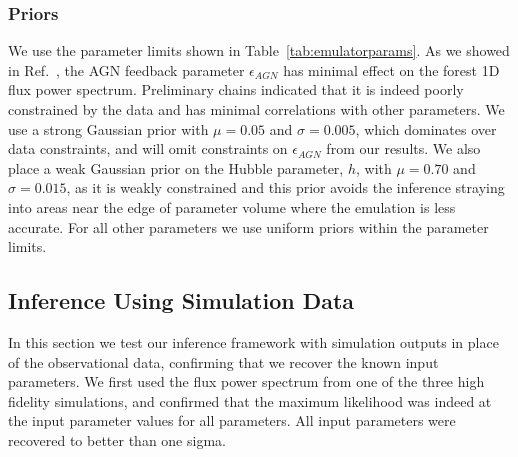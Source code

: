 \subsubsection{Priors}

We use the parameter limits shown in Table~\ref{tab:emulatorparams}.
As we showed in Ref.~\cite{2023simsuite}, the AGN feedback parameter $\epsilon_{AGN}$ has minimal effect on the \Lya forest 1D flux power spectrum.
Preliminary chains indicated that it is indeed poorly constrained by the data and has minimal correlations with other parameters.
We use a strong Gaussian prior with $\mu = 0.05$ and $\sigma = 0.005$, which dominates over data constraints, and will omit constraints on $\epsilon_{AGN}$ from our results.
We also place a weak Gaussian prior on the Hubble parameter, $h$, with $\mu = 0.70$ and $\sigma = 0.015$, as it is weakly constrained and this prior avoids the inference straying into areas near the edge of parameter volume where the emulation is less accurate.
For all other parameters we use uniform priors within the parameter limits.

\subsection{Inference Using Simulation Data}\label{sec:simdat}

In this section we test our inference framework with simulation outputs in place of the observational data, confirming that we recover the known input parameters.
We first used the flux power spectrum from one of the three high fidelity simulations, and confirmed that the maximum likelihood was indeed at the input parameter values for all parameters.
All input parameters were recovered to better than one sigma.

